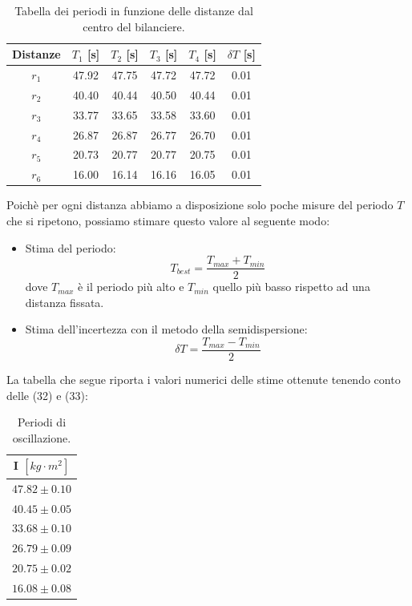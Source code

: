 \begin{table}[H]
	\centering
	\begin{tabular}{|c|c|c|c|c|c|}
		\hline
            Distanze & $T_1$ [s] & $T_2$ [s]& $T_3$ [s]& $T_4$ [s] & $\delta T$ [s]\\
            \hline
            $r_1$ & 47.92 & 47.75 & 47.72 & 47.72 & 0.01\\
            \hline
            $r_2$ & 40.40 & 40.44 & 40.50 & 40.44 & 0.01\\
            \hline
            $r_3$ & 33.77 & 33.65 & 33.58 & 33.60 & 0.01\\
            \hline
            $r_4$ & 26.87 & 26.87 & 26.77 & 26.70 & 0.01\\
            \hline
            $r_5$ & 20.73 & 20.77 & 20.77 & 20.75 & 0.01\\
            \hline
            $r_6$ & 16.00 & 16.14 & 16.16 & 16.05 & 0.01\\
            \hline
        \end{tabular}
	\caption{Tabella dei periodi in funzione delle distanze dal centro del bilanciere.}
	\label{tab:}
\end{table}

Poichè per ogni distanza abbiamo a disposizione solo poche misure del periodo $T$ che si ripetono, possiamo stimare questo valore al seguente modo:
\begin{itemize}
    \item Stima del periodo:
    \begin{equation}
        T_{best} = \frac{T_{max} + T_{min}}{2}
    \end{equation}
    dove $T_{max}$ è il periodo più alto e $T_{min}$ quello più basso rispetto ad una distanza fissata.
    \item Stima dell'incertezza con il metodo della semidispersione: 
    \begin{equation}
        \delta T = \frac{T_{max} - T_{min}}{2}
    \end{equation}
\end{itemize}

La tabella che segue riporta i valori numerici delle stime ottenute tenendo conto delle (32) e (33):

\begin{table}[H]
	\centering
	\begin{tabular}{|c|}
		\hline
		\textbf{I $[kg \cdot m^2]$} \\
		\hline
		$47.82\pm 0.10$ \\
		$40.45\pm 0.05$ \\
		$33.68\pm 0.10$ \\
		$26.79\pm 0.09$ \\
		$20.75\pm 0.02$ \\
            $16.08 \pm 0.08$ \\
		\hline
	\end{tabular}
	\caption{Periodi di oscillazione.}
	\label{tab:}
\end{table}


